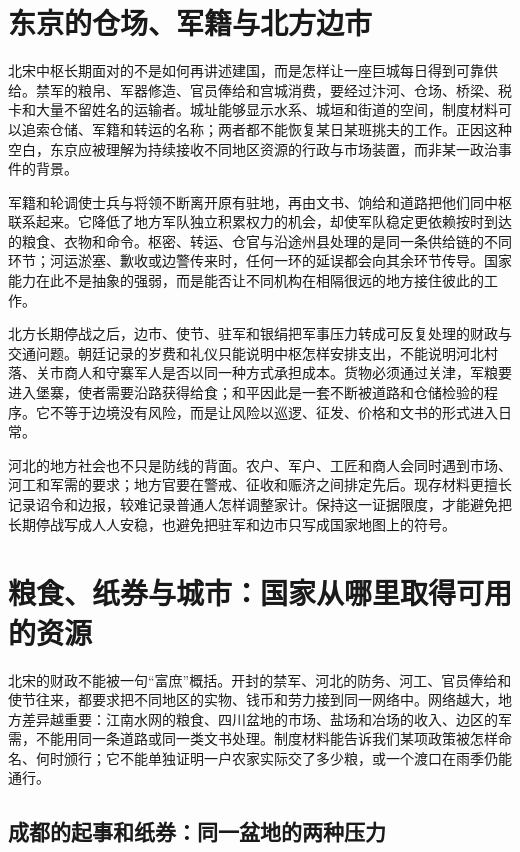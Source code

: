 \section{东京的仓场、军籍与北方边市}

北宋中枢长期面对的不是如何再讲述建国，而是怎样让一座巨城每日得到可靠供给。禁军的粮帛、军器修造、官员俸给和宫城消费，要经过汴河、仓场、桥梁、税卡和大量不留姓名的运输者。城址能够显示水系、城垣和街道的空间，制度材料可以追索仓储、军籍和转运的名称；两者都不能恢复某日某班挑夫的工作。正因这种空白，东京应被理解为持续接收不同地区资源的行政与市场装置，而非某一政治事件的背景。

军籍和轮调使士兵与将领不断离开原有驻地，再由文书、饷给和道路把他们同中枢联系起来。它降低了地方军队独立积累权力的机会，却使军队稳定更依赖按时到达的粮食、衣物和命令。枢密、转运、仓官与沿途州县处理的是同一条供给链的不同环节；河运淤塞、歉收或边警传来时，任何一环的延误都会向其余环节传导。国家能力在此不是抽象的强弱，而是能否让不同机构在相隔很远的地方接住彼此的工作。

北方长期停战之后，边市、使节、驻军和银绢把军事压力转成可反复处理的财政与交通问题。朝廷记录的岁费和礼仪只能说明中枢怎样安排支出，不能说明河北村落、关市商人和守寨军人是否以同一种方式承担成本。货物必须通过关津，军粮要进入堡寨，使者需要沿路获得给食；和平因此是一套不断被道路和仓储检验的程序。它不等于边境没有风险，而是让风险以巡逻、征发、价格和文书的形式进入日常。

河北的地方社会也不只是防线的背面。农户、军户、工匠和商人会同时遇到市场、河工和军需的要求；地方官要在警戒、征收和赈济之间排定先后。现存材料更擅长记录诏令和边报，较难记录普通人怎样调整家计。保持这一证据限度，才能避免把长期停战写成人人安稳，也避免把驻军和边市只写成国家地图上的符号。
\section{粮食、纸券与城市：国家从哪里取得可用的资源}

北宋的财政不能被一句“富庶”概括。开封的禁军、河北的防务、河工、官员俸给和使节往来，都要求把不同地区的实物、钱币和劳力接到同一网络中。网络越大，地方差异越重要：江南水网的粮食、四川盆地的市场、盐场和冶场的收入、边区的军需，不能用同一条道路或同一类文书处理。制度材料能告诉我们某项政策被怎样命名、何时颁行；它不能单独证明一户农家实际交了多少粮，或一个渡口在雨季仍能通行。

\subsection{成都的起事和纸券：同一盆地的两种压力}

